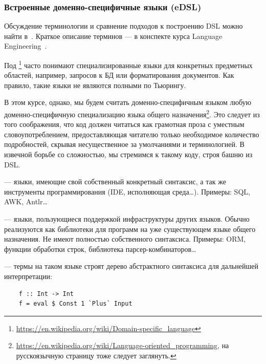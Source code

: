 \subsubsection{Встроенные доменно-специфичные языки (eDSL)} \label{subsec:edsl}

Обсуждение терминологии и сравнение подходов к построению DSL можно найти в~\cite{gibbons2013functional}.
Краткое описание терминов --- в конспекте курса Language Engineering~\cite{languageEngineering}.

Под \footnote{\url{https://en.wikipedia.org/wiki/Domain-specific_language}} часто понимают специализированные языки для конкретных предметных областей, например, запросов к БД или форматирования документов.
Как правило, такие языки не являются полными по Тьюрингу.

В этом курсе, однако, мы будем считать доменно-специфичным языком любую доменно-специфичную специализацию языка общего назначения\footnote{\url{https://en.wikipedia.org/wiki/Language-oriented_programming}, на русскоязычную страницу тоже следует заглянуть.}.
Это следует из того соображения, что код должен читаться как грамотная проза с уместным словоупотреблением, предоставляющая читателю только необходимое количество подробностей, скрывая несущественное за умолчаниями и терминологией.
В извечной борьбе со сложностью, мы стремимся к такому коду, строя башню из DSL\@.

 --- языки, имеющие свой собственный конкретный синтаксис, а так же инструменты программирования (IDE, исполняющая среда\ldots).
Примеры: SQL, AWK, Antlr\ldots

 --- языки, пользующиеся поддержкой инфраструктуры других языков.
Обычно реализуются как библиотеки для программ на уже существующем языке общего назначения.
Не имеют полностью собственного синтаксиса.
Примеры: ORM, функции обработки строк, библиотека парсер-комбинаторов\ldots

 --- термы на таком языке строят дерево абстрактного синтаксиса для дальнейшей интерпретации:
\begin{verbatim}
    f :: Int -> Int
    f = eval $ Const 1 `Plus` Input
\end{verbatim}

%


